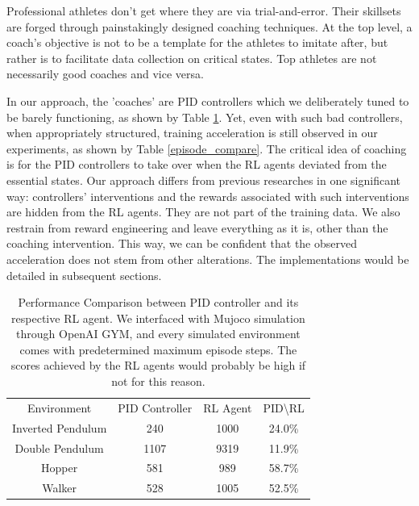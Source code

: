\documentclass[journal]{IEEEtran}
\begin{document}
Professional athletes don't get where they are via trial-and-error. Their skillsets are forged through painstakingly designed coaching techniques. At the top level, a coach's objective is not to be a template for the athletes to imitate after, but rather is to facilitate data collection on critical states. Top athletes are not necessarily good coaches and vice versa. 

In our approach, the 'coaches' are PID controllers which we deliberately tuned to be barely functioning, as shown by Table \ref{score_compare}. Yet, even with such bad controllers, when appropriately structured, training acceleration is still observed in our experiments, as shown by Table \ref{episode_compare}. The critical idea of coaching is for the PID controllers to take over when the RL agents deviated from the essential states. Our approach differs from previous researches in one significant way: controllers' interventions and the rewards associated with such interventions are hidden from the RL agents. They are not part of the training data. We also restrain from reward engineering and leave everything as it is, other than the coaching intervention. This way, we can be confident that the observed acceleration does not stem from other alterations. The implementations would be detailed in subsequent sections.


\begin{table}[H]
\footnotesize
\caption{Performance Comparison between PID controller and its respective RL agent. We interfaced with Mujoco simulation through OpenAI GYM, and every simulated environment comes with predetermined maximum episode steps. The scores achieved by the RL agents would probably be high if not for this reason.}
\label{score_compare}
\centering
\begin{tabular}{ cccc }
\rowcolor{airforceblue}
Environment &   PID Controller &RL Agent &PID\textbackslash RL \\
Inverted Pendulum &  240 & 1000&  24.0\%\\
\rowcolor{beaublue}

Double Pendulum &  1107 & 9319& 11.9\%\\

Hopper &  581 & 989& 58.7\%\\
\rowcolor{beaublue}
Walker &  528 & 1005& 52.5\%\\
\end{tabular}
\end{table}
\end{document}
